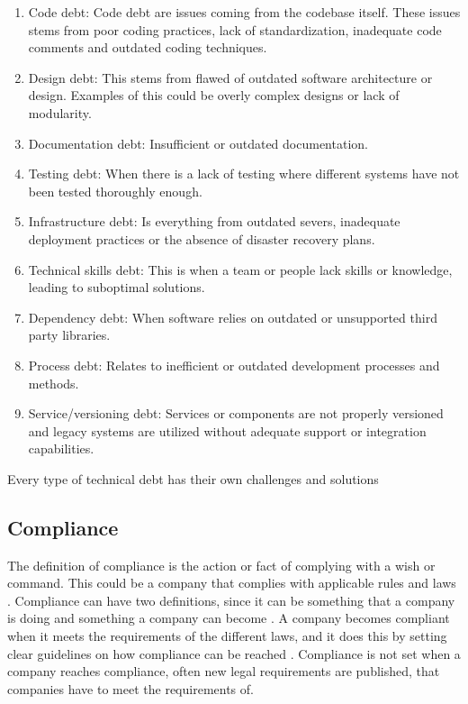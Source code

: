 \begin{enumerate}
	\item Code debt: Code debt are issues coming from the codebase itself.  These issues stems from poor coding practices, lack of standardization, inadequate code comments and outdated coding techniques.
	\item Design debt: This stems from flawed of outdated software architecture or design. Examples of this could be overly complex designs or lack of modularity.
	\item Documentation debt: Insufficient or outdated documentation.
	\item Testing debt: When there is a lack of testing where different systems have not been tested thoroughly enough.
	\item Infrastructure debt: Is everything from outdated severs, inadequate deployment practices or the absence of disaster recovery plans.
	\item Technical skills debt: This is when a team or people lack skills or knowledge, leading to suboptimal solutions.
	\item Dependency debt: When software relies on outdated or unsupported third party libraries.
	\item Process debt: Relates to inefficient or outdated development processes and methods.
	\item Service/versioning debt: Services or components are not properly versioned and legacy systems are utilized without adequate support or integration capabilities.
\end{enumerate}

Every type of technical debt has their own challenges and solutions\citep{TechinicalDebtOUTsystem}
\subsection{Compliance}
The definition of compliance is the action or fact of complying with a wish or command. This could be a company that complies with applicable rules and laws \citep{2024compliance?}. Compliance can have two definitions, since it can be something that a company is doing and something a company can become \citep{legaldeskcompliance}. A company becomes compliant when it meets the requirements of the different laws, and it does this by setting clear guidelines on how compliance can be reached \citep{legaldeskcompliance}. Compliance is not set when a company reaches compliance, often new legal requirements are published, that companies have to meet the requirements of.


